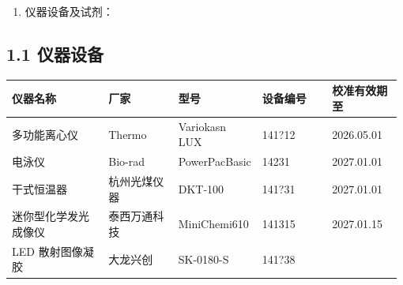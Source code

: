 \documentclass[UTF8,10pt,a4paper,fontset=fandol]{ctexart}
\newcommand{\fieldvalue}[1]{#1}
\newcommand{\handwritten}[1]{#1}
\begin{document}
\begin{enumerate}
\item 仪器设备及试剂：
\end{enumerate}

\subsection{1.1 仪器设备}

\begin{center}
\small
\begin{tabular}{|p{0.25\linewidth}|p{0.18\linewidth}|p{0.19\linewidth}|p{0.18\linewidth}|p{0.18\linewidth}|}
\hline
仪器名称 & 厂家 & 型号 & 设备编号 & 校准有效期至\\
\hline
多功能离心仪 & Thermo & Variokasn LUX &
\fieldvalue{\handwritten{141?12}} &
\fieldvalue{\handwritten{2026.05.01}}\\
\hline
电泳仪 & Bio-rad & PowerPacBasic &
\fieldvalue{\handwritten{14231}} &
\fieldvalue{\handwritten{2027.01.01}}\\
\hline
干式恒温器 & 杭州光煤仪器 & DKT-100 &
\fieldvalue{\handwritten{141?31}} &
\fieldvalue{\handwritten{2027.01.01}}\\
\hline
迷你型化学发光成像仪 & 泰西万通科技 & MiniChemi610 &
\fieldvalue{\handwritten{141315}} &
\fieldvalue{\handwritten{2027.01.15}}\\
\hline
LED 散射图像凝胶 & 大龙兴创 & SK-0180-S &
\fieldvalue{\handwritten{141?38}} &

\end{tabular}
\end{center}
\end{document}
